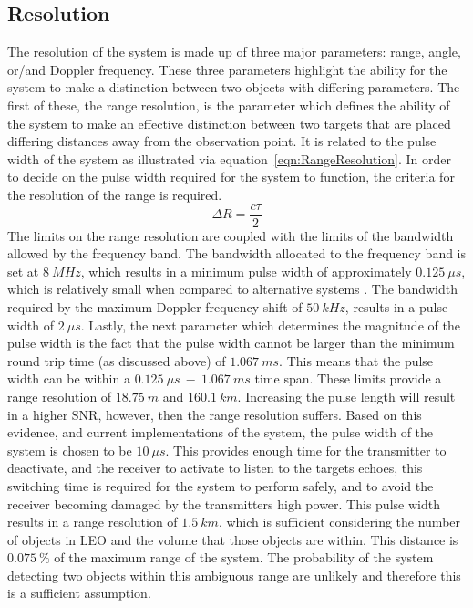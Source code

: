 \documentclass[11pt]{witseiepaper}
\begin{document}
\begin{bibunit}[witseie]
\subsection{Resolution} \label{sec:Resolution}
The resolution of the system is made up of three major parameters: range, angle, or/and Doppler frequency. These three parameters highlight the ability for the system to make a distinction between two objects with differing parameters.
The first of these, the range resolution, is the parameter which defines the ability of the system to make an  effective distinction between two targets that are placed differing distances away from the observation point. It is related to the pulse width of the system as illustrated via equation~\ref{eqn:RangeResolution}. In order to decide on the pulse width required for the system to function, the criteria for the resolution of the range is required.
\begin{equation} \label{eqn:RangeResolution}
\Delta R = \frac{c \tau}{2}
\end{equation}
The limits on the range resolution are coupled with the limits of the bandwidth allowed by the frequency band. 
The bandwidth allocated to the frequency band is set at $8~MHz$, which results in a minimum pulse width of approximately $0.125~\mu s$, which is relatively small when compared to alternative systems \cite{AMISR, EISCAT, SIMO, telescope, BeamForming, OrbitDetermination, PlanarArray}. The bandwidth required by the maximum Doppler frequency shift of $50~kHz$, results in a pulse width of $2~\mu s$.
Lastly, the next parameter which determines the magnitude of the pulse width is the fact that the pulse width cannot be larger than the minimum round trip time (as discussed above) of $1.067~ms$. 
This means that the pulse width can be within a $0.125~\mu s~-~1.067~ms$ time span.
These limits provide a range resolution of $18.75~m$ and $160.1~km$. Increasing the pulse length will result in a higher SNR, however, then the range resolution suffers.
Based on this evidence, and current implementations of the system, the pulse width of the system is chosen to be $10~\mu s$. This provides enough time for the transmitter to deactivate, and the receiver to activate to listen to the targets echoes, this switching time is required for the system to perform safely, and to avoid the receiver becoming damaged by the transmitters high power.
This pulse width results in a range resolution of $1.5~km$, which is sufficient considering the number of objects in LEO and the volume that those objects are within. This distance is $0.075~\%$ of the maximum range of the system. The probability of the system detecting two objects within this ambiguous range are unlikely and therefore this is a sufficient assumption.%


\end{bibunit}
\end{document}
